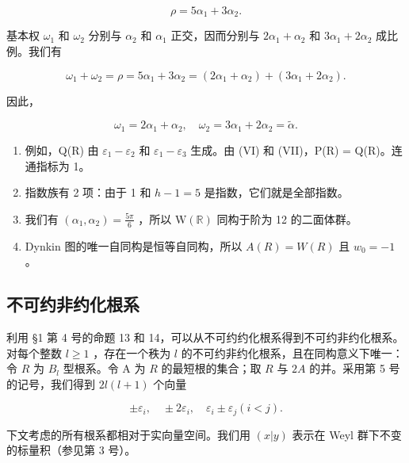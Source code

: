 \[
\rho = 5 \alpha_ {1} + 3 \alpha_ {2}.
\]

基本权 \(\omega_{1}\) 和 \(\omega_{2}\) 分别与 \(\alpha_{2}\) 和 \(\alpha_{1}\) 正交，因而分别与 \(2\alpha_{1} + \alpha_{2}\) 和 \(3\alpha_{1} + 2\alpha_{2}\) 成比例。我们有

\[
\omega_ {1} + \omega_ {2} = \rho = 5 \alpha_ {1} + 3 \alpha_ {2} = (2 \alpha_ {1} + \alpha_ {2}) + (3 \alpha_ {1} + 2 \alpha_ {2}).
\]

因此，

\[
\omega_ {1} = 2 \alpha_ {1} + \alpha_ {2}, \quad \omega_ {2} = 3 \alpha_ {1} + 2 \alpha_ {2} = \tilde {\alpha}.
\]

\begin{enumerate}
\def\labelenumi{(\Roman{enumi})}
\setcounter{enumi}{7}
\item
  例如，Q(R) 由 \(\varepsilon_{1}-\varepsilon_{2}\) 和 \(\varepsilon_{1}-\varepsilon_{3}\) 生成。由 (VI) 和 (VII)，P(R) = Q(R)。连通指标为 1。
\item
  指数族有 2 项：由于 1 和 \(h - 1 = 5\) 是指数，它们就是全部指数。
\item
  我们有 \((\alpha_{1},\alpha_{2}) = \frac{5\pi}{6}\) ，所以 \(\mathrm{W}(\mathbb{R})\) 同构于阶为 12 的二面体群。
\item
  Dynkin 图的唯一自同构是恒等自同构，所以 \(A(R) = W(R)\) 且 \(w_{0} = -1\) 。
\end{enumerate}

\subsection{不可约非约化根系}

利用 §1 第 4 号的命题 13 和 14，可以从不可约约化根系得到不可约非约化根系。对每个整数 \(l \geqslant 1\) ，存在一个秩为 \(l\) 的不可约非约化根系，且在同构意义下唯一：令 \(R\) 为 \(B_l\) 型根系。令 A 为 \(R\) 的最短根的集合；取 \(R\) 与 \(2A\) 的并。采用第 5 号的记号，我们得到 \(2l(l + 1)\) 个向量

\[
\pm \varepsilon_ {i}, \quad \pm 2 \varepsilon_ {i}, \quad \varepsilon_ {i} \pm \varepsilon_ {j} (i <   j).
\]


下文考虑的所有根系都相对于实向量空间。我们用 \((x|y)\) 表示在 Weyl 群下不变的标量积（参见第 3 号）。

